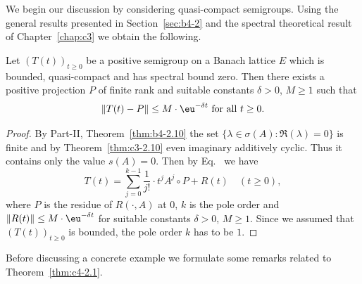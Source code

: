 We begin our discussion by considering quasi-compact semigroups.
Using the general results presented in Section~\ref{sec:b4-2}  and the spectral theoretical result of Chapter~\ref{chap:c3} we obtain the following.
\begin{theorem}\label{thm:c4-2.1}
Let $(T(t))_{t \geq 0}$ be a positive semigroup on a Banach lattice $E$ which is bounded, quasi-compact and has spectral bound zero.
Then there exists a positive projection $P$ of finite rank and suitable constants $\delta > 0$, $M \geq 1$ such that
\begin{equation}\label{eq:c4-2.1}
\|T(t) - P\| \leq M \cdot \eu^{-\delta t} \text{ for all } t \geq 0.
\end{equation}
\end{theorem}
\begin{proof}
By Part-II, Theorem~\ref{thm:b4-2.10} the set $\{\lambda \in \sigma(A) \colon \Re(\lambda) = 0\}$ is finite and by Theorem~\ref{thm:c3-2.10}  even imaginary additively cyclic.
Thus it contains only the value $s(A) = 0$.
Then by %
Eq.~ 
we have
\begin{equation*}\label{eq:c4-2.1-kgk}
T(t) = \sum_{j=0}^{k-1} \frac{1}{j!} \cdot t^{j}A^{j}\circ P + R(t) \quad (t \geq 0),
\end{equation*}
where $P$ is the residue of\/ $R(\cdot,A)$ at $0$, $k$ is the pole order and $\|R(t)\| \leq M \cdot \eu^{-\delta t}$ for suitable constants $\delta > 0$, $M \geq 1$.
Since we assumed that $(T(t))_{t \geq 0}$ is bounded, the pole order $k$ has to be $1$.
\end{proof}
Before discussing a concrete example we formulate some remarks related to Theorem~\ref{thm:c4-2.1}.
